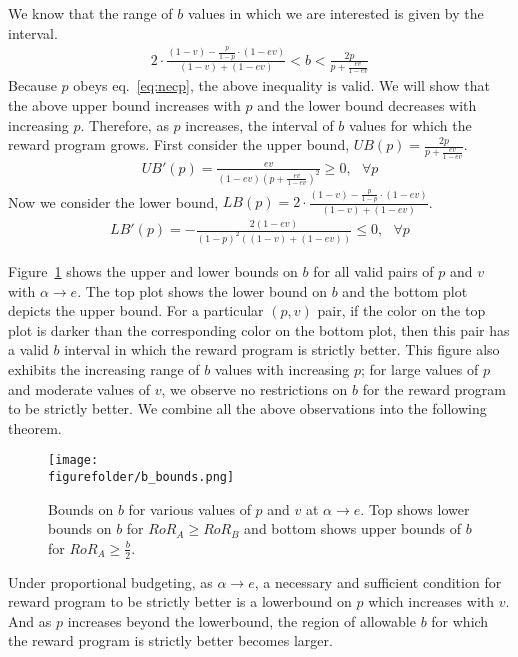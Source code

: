 \proof
We know that the range of $b$ values in which we are interested is given by the interval.
\begin{align*}
2\cdot \frac{(1-v) - \frac{p}{1-p}\cdot (1-ev)}{(1-v) + (1-ev)} < b < \frac{2p}{p+\frac{ev}{1-ev}}
\end{align*}
Because $p$ obeys eq.~\ref{eq:necp}, the above inequality is valid. We will show that the above upper bound increases with $p$ and the lower bound decreases with increasing $p$. Therefore, as $p$ increases, the interval of $b$ values for which the reward program grows. First consider the upper bound, $UB(p) = \frac{2p}{p+\frac{ev}{1-ev}}$.
\begin{align*}
UB'(p) = \frac{ev}{(1-ev)\left(p+\frac{ev}{1-ev} \right)^2} \geq 0, \mbox{ } \forall p
\end{align*}
Now we consider the lower bound, $LB(p) = 2\cdot \frac{(1-v) - \frac{p}{1-p}\cdot (1-ev)}{(1-v) + (1-ev)}$.
\begin{align*}
LB'(p) = -\frac{2(1-ev)}{(1-p)^2((1-v)+(1-ev))} \leq 0, \mbox{ } \forall p
\end{align*}
\endproof

Figure~\ref{fig:b_restrictions} shows the upper and lower bounds on $b$ for all valid pairs of $p$ and $v$ with $\alpha \rightarrow e$. 
The top plot shows the lower bound on $b$ and the bottom plot depicts the upper bound. 
For a particular $(p,v)$ pair, if the color on the top plot is darker than the corresponding color on the bottom plot, then this pair has a valid $b$ interval in which the reward program is strictly better. 
This figure also exhibits the increasing range of $b$ values with increasing $p$; for large values of $p$ and moderate values of $v$, we observe no restrictions on $b$ for the reward program to be strictly better. 
We combine all the above observations into the following theorem.

\begin{figure}[h!]
\begin{centering}
\texttt{[image: \\figurefolder/b\_bounds.png]}
\caption{Bounds on $b$ for various values of $p$ and $v$ at $\alpha \rightarrow e$. Top shows lower bounds on $b$ for $RoR_A \geq RoR_B$ and bottom shows upper bounds of $b$ for $RoR_A \geq \frac{b}{2}$.}
\label{fig:b_restrictions}
\end{centering}
\end{figure}

\begin{theorem}
Under proportional budgeting, as $\alpha\rightarrow e$, a necessary and sufficient condition for reward program to be strictly better is a lowerbound on $p$ which increases with $v$.  
And as $p$ increases beyond the lowerbound, the region of allowable $b$ for which the reward program is strictly better becomes larger. 
\end{theorem}

